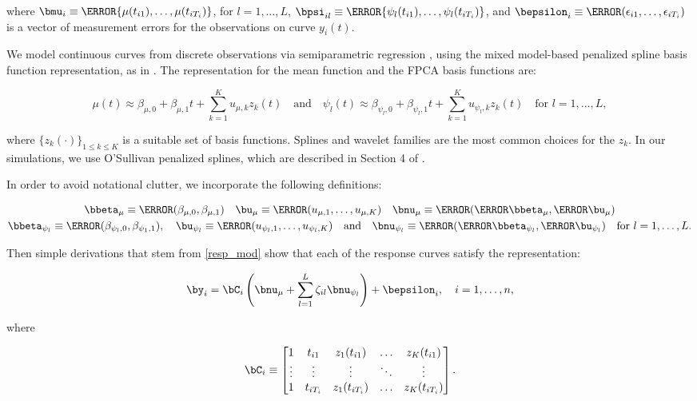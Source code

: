 \documentclass[12pt]{article}
\def\betamu{\bbeta_\mu}
\def\umu{\bu_\mu}
\def\numu{\bnu_\mu}
\newcommand\betapsi[1]{\bbeta_{\psi_{#1}}}
\newcommand\upsi[1]{\bu_{\psi_{#1}}}
\newcommand\nupsi[1]{\bnu_{\psi_{#1}}}
\theoremstyle{plain}
\theoremstyle{definition}
\theoremstyle{remark}
\begin{document}
\noindent where $\bmu_i \equiv \T{\{ \mu (t_{i1}), \dots, \mu (t_{iT_i}) \}}$, for $l = 1, \dots, L$,
$\bpsi_{il} \equiv \T{\{ \psi_l (t_{i1}), \dots, \psi_l (t_{iT_i}) \}}$, and
$\bepsilon_{i} \equiv \T{(\epsilon_{i1}, \dots, \epsilon_{iT_i})}$ is a vector of measurement errors
for the observations on curve $y_i (t)$.

We model continuous curves from discrete observations via semiparametric regression \cite{ruppert03, ruppert09},
using the mixed model-based penalized spline basis function representation, as in . The
representation for the mean function and the FPCA basis functions are:

\[
	\mu (t) \approx \beta_{\mu, 0} + \beta_{\mu, 1} t + \sum_{k=1}^K u_{\mu, k} z_k (t) \quad
	\text{and} \quad
	\psi_l (t) \approx \beta_{\psi_l, 0} + \beta_{\psi_l, 1} t + \sum_{k=1}^K u_{\psi_l, k} z_k (t) \quad
	\text{for $l = 1, \dots, L$},
\]

\noindent where $\{ z_k (\cdot) \}_{1 \le k \le K}$ is a suitable set of
basis functions. Splines and wavelet families are the most common choices for the $z_k$. In our simulations, we
use O'Sullivan penalized splines, which are described in Section 4 of .

In order to avoid notational clutter, we incorporate the following definitions:

\[
\begin{gathered}
	\betamu \equiv \T{(\beta_{\mu, 0}, \beta_{\mu, 1})} \quad
		\umu \equiv \T{(u_{\mu, 1}, \dots, u_{\mu, K})} \quad
		\numu \equiv \T{(\T{\betamu}, \T{\umu})} \\
	\betapsi{l} \equiv \T{(\beta_{\psi_l, 0}, \beta_{\psi_1, 1})}, \quad
		\upsi{l} \equiv \T{(u_{\psi_l, 1}, \dots, u_{\psi_l, K})} \quad
		\text{and} \quad
		\nupsi{l} \equiv \T{(\T{\betapsi{l}}, \T{\upsi{l}})} \quad
		\text{for $l = 1, \dots, L$}.
\end{gathered}
\]

\noindent Then simple derivations that stem from \eqref{resp_mod} show that each of the response curves satisfy the
representation:

\[
	\by_i = \bC_i \left(
		\numu + \sum_{l=1}^L \zeta_{il} \nupsi{l}
	\right) + \bepsilon_{i}, \quad i = 1, \dots, n,
\]

\noindent where

\begin{equation}
	\bC_i \equiv \begin{bmatrix}
		1 & t_{i1} & z_1 (t_{i1}) & \dots & z_K (t_{i1}) \\
		\vdots & \vdots & \vdots & \ddots & \vdots \\
		1 & t_{iT_i} & z_1 (t_{iT_i}) & \dots & z_K (t_{iT_i})
	\end{bmatrix}.
\label{C_mat}
\end{equation}
\end{document}
